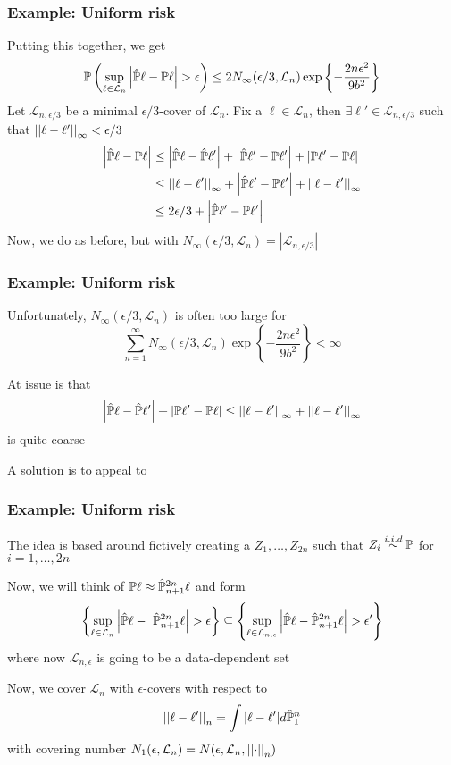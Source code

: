 \documentclass[12pt]{beamer}
\begin{document}
\begin{frame}[fragile]
\frametitle{Example: Uniform risk }
Putting this together, we get
\[
\P\left(\sup_{\ell \in \mathcal{L}_n} \left|  \hat\P\ell - \P\ell \right| > \epsilon \right) \leq 2 N_\infty(\epsilon/3,\mathcal{L}_n) \exp\left\{ -\frac{2n\epsilon^2}{9b^2}\right\}
\]
 Let $\mathcal{L}_{n,\epsilon/3}$ be a minimal $\epsilon/3$-cover of $\mathcal{L}_n$.
Fix a $\ell \in \mathcal{L}_n$, then $\exists \ell' \in \mathcal{L}_{n,\epsilon/3}$ such that $\norm{\ell - \ell'}_\infty < \epsilon/3$
\begin{align*}
\left|  \hat\P\ell - \P\ell \right|  
& \leq
\left|  \hat\P\ell - \hat\P\ell' \right|  + \left|  \hat\P\ell' - \P\ell' \right|   + \left|  \P\ell' - \P\ell \right|  \\
& \leq
\norm{\ell - \ell'}_{\infty} + \left|  \hat\P\ell' - \P\ell' \right|   + \norm{\ell - \ell'}_{\infty} \\
& \leq
2\epsilon/3 + \left|  \hat\P\ell' - \P\ell' \right|   
\end{align*}
Now, we do as before, but with $N_\infty(\epsilon/3,\mathcal{L}_n) = |\mathcal{L}_{n,\epsilon/3}|$ 
\end{frame}

\begin{frame}[fragile]
\frametitle{Example: Uniform risk }
Unfortunately, $N_\infty(\epsilon/3,\mathcal{L}_n)$ is often too large for
\[
\sum_{n=1}^\infty N_\infty(\epsilon/3,\mathcal{L}_n) \exp\left\{ -\frac{2n\epsilon^2}{9b^2}\right\} < \infty
\]

\vsp
At issue is that
\[
\left|  \hat\P\ell - \hat\P\ell' \right|    + \left|  \P\ell' - \P\ell \right|  
 \leq
\norm{\ell - \ell'}_{\infty}  + \norm{\ell - \ell'}_{\infty} 
\]
is quite coarse

\vsp
A solution is to appeal to 
\end{frame}

\begin{frame}[fragile]
\frametitle{Example: Uniform risk }
The idea is based around fictively creating a  $Z_{1},\ldots,Z_{2n}$  such that
$Z_i \stackrel{i.i.d}{\sim} \P$ for $i=1,\ldots,2n$

\vsp
Now, we will think of $\P \ell \approx \hat\P_{n+1}^{2n} \ell$ and form
\[
\left\{ \sup_{\ell \in \mathcal{L}_n} \left| \hat\P\ell - \ \hat\P_{n+1}^{2n}\ell\right| > \epsilon \right\}  \subseteq
\left\{ \sup_{\ell \in \mathcal{L}_{n,\epsilon}} \left| \hat\P\ell -  \hat\P_{n+1}^{2n}\ell \right| > \epsilon' \right\}
\]
where now $\mathcal{L}_{n,\epsilon}$ is going to be a data-dependent set 


\vsp
Now, we cover $\mathcal{L}_n$ with $\epsilon$-covers with respect to
\[
\norm{\ell - \ell'}_{n} = \int |\ell - \ell'| d\hat\P_{1}^{n}
\]
with covering number $N_1(\epsilon,\mathcal{L}_n) = N(\epsilon,\mathcal{L}_n,\norm{\cdot}_{n})$
\end{frame}
\end{document}
